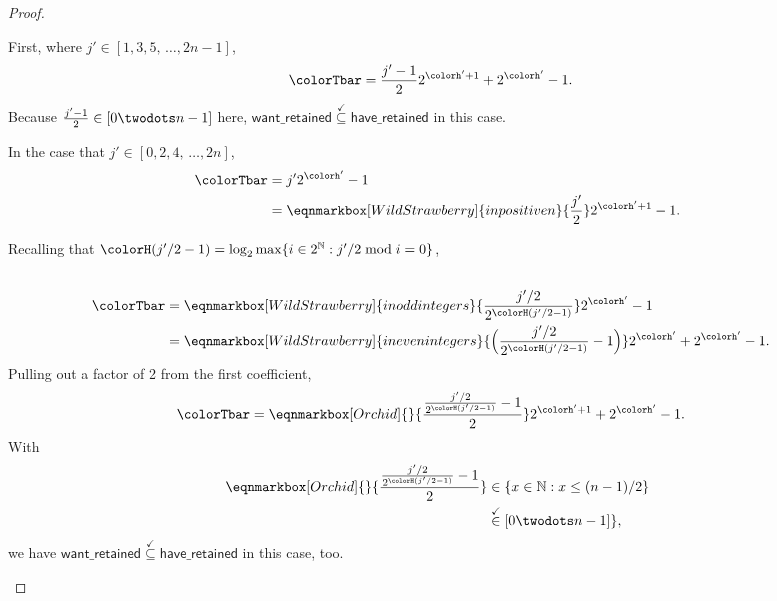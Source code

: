 \begin{proof}
\begin{proofpart}
First, where $j' \in [1,3,5,\,\ldots,2n-1]$,
\begin{align*}
\colorTbar
&= \frac{j'-1}{2} 2^{\colorh' + 1} + 2^{\colorh'} - 1.
\end{align*}
Because $\frac{j'-1}{2} \in [0 \twodots n-1]$ here, $\mathsf{want\_retained} \stackrel{\checkmark}{\subseteq} \mathsf{have\_retained}$ in this case.

In the case that $j' \in [0,2,4,\,\ldots,2n]$,
\begin{align*}
\colorTbar
&= j'2^{\colorh'} - 1\\
&=
\eqnmarkbox[WildStrawberry]{inpositiven}{
  \frac{j'}{2}
}2^{\colorh' + 1} - 1.
\end{align*}

Recalling that $\colorH(j'/2 - 1) = \log_2 \max\{ i \in 2^{\mathbb{N}} : j'/2 \bmod i = 0 \}$,
\begin{align*}
\\
\colorTbar
&=
\eqnmarkbox[WildStrawberry]{inoddintegers}{
  \frac{j'/2}{2^{\colorH(j'/2 - 1)}}
}
2^{\colorh'} - 1\\
&=
\eqnmarkbox[WildStrawberry]{inevenintegers}{
  \Big(\frac{j'/2}{2^{\colorH(j'/2 - 1)}} - 1\Big)
}
2^{\colorh'} + 2^{\colorh'} - 1.\\
\end{align*}
Pulling out a factor of 2 from the first coefficient,
\begin{align*}
  \colorTbar
  &=
  \eqnmarkbox[Orchid]{}{
  \frac{
    \frac{j'/2}{2^{\colorH(j'/2 - 1)}} - 1
  }{2}
  }
2^{\colorh' + 1} + 2^{\colorh'} - 1.
\end{align*}
With
\begin{align*}
  \eqnmarkbox[Orchid]{}{
  \frac{
    \frac{j'/2}{2^{\colorH(j'/2 - 1)}} - 1
  }{2}
  }
  &\in \{x \in \mathbb{N}: x \leq (n-1)/2\}\\
  &\stackrel{\checkmark}{\in} [0 \twodots n-1]\},
\end{align*}
we have $\mathsf{want\_retained} \stackrel{\checkmark}{\subseteq} \mathsf{have\_retained}$ in this case, too.
\end{proofpart}
\end{proof}
